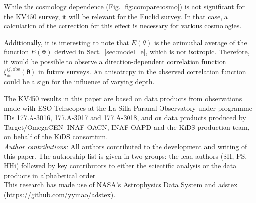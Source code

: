 \documentclass{aa}
\renewcommand{\rm}{\mathrm}
\def\b#1{\bm{#1}}
\begin{document}
While the cosmology dependence (Fig. \ref{fig:comparecosmo}) is not significant for the KV450 survey, it will be relevant for the Euclid survey. In that case, a calculation of the correction for this effect is necessary for various cosmologies.

Additionally, it is interesting to note that $E(\theta)$ is the azimuthal average of the function $E(\b\theta)$ derived in Sect.~\ref{sec:model_e}, which is not isotropic. Therefore, it would be possible to observe a direction-dependent correlation function $\xi_\pm^{ij,\rm{obs}}(\b\theta)$ in future surveys. An anisotropy in the observed correlation function could be a sign for the influence of varying depth.



\begin{acknowledgements}
The KV450 results in this paper are based on data products from observations
made with ESO Telescopes at the La Silla Paranal Observatory under programme
IDs 177.A-3016, 177.A-3017 and 177.A-3018, and on data products produced by
Target/OmegaCEN, INAF-OACN, INAF-OAPD and the KiDS production team,
on behalf of the KiDS consortium.
\\
\emph{Author contributions:} All authors contributed to the development and writing of this paper. The authorship list is given in two groups: the lead authors (SH, PS, HHi) followed by key contributors to either the scientific analysis or the data products in alphabetical order.
\\
This research has made use of NASA's Astrophysics Data System and adstex (\url{https://github.com/yymao/adstex}).
\end{acknowledgements}
\end{document}
